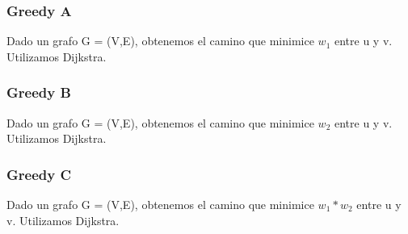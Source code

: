 \documentclass[11pt, a4paper, twoside]{article}
\begin{document}
{}

\subsubsection{Greedy A}\label{subsubsec:greedy-a}
Dado un grafo G = (V,E), obtenemos el camino que minimice $w_1$ entre u y v. Utilizamos Dijkstra.
\clearpage

\subsubsection{Greedy B}\label{subsubsec:greedy-b}
Dado un grafo G = (V,E), obtenemos el camino que minimice $w_2$ entre u y v. Utilizamos Dijkstra.
\clearpage

\subsubsection{Greedy C}\label{subsubsec:greedy-c}
Dado un grafo G = (V,E), obtenemos el camino que minimice $w_1 * w_2$ entre u y v. Utilizamos Dijkstra.


\end{document}

